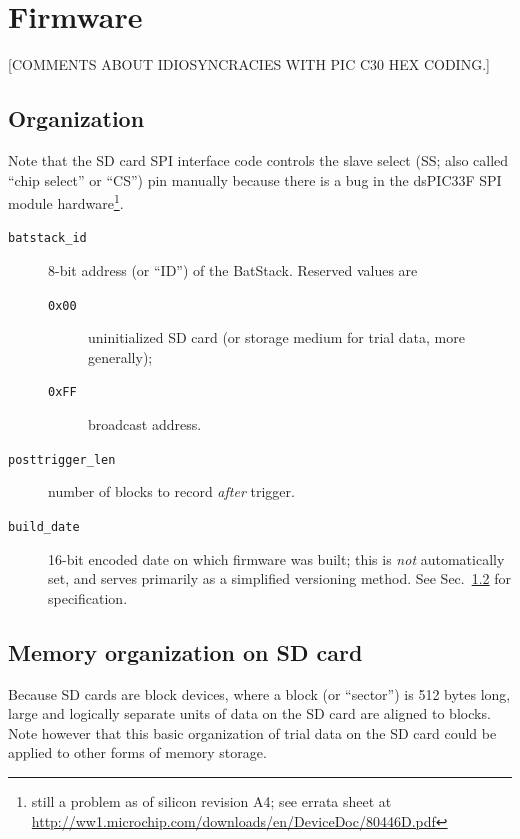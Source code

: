 \documentclass[letterpaper]{article}
\begin{document}
\section{Firmware}
\label{firmware:sec}

[COMMENTS ABOUT IDIOSYNCRACIES WITH PIC C30 HEX CODING.]

\subsection{Organization}

Note that the SD card SPI interface code controls the slave select
(SS; also called ``chip select'' or ``CS'') pin manually because there
is a bug in the dsPIC33F SPI module hardware\footnote{still a problem
  as of silicon revision A4; see errata sheet at
  \url{http://ww1.microchip.com/downloads/en/DeviceDoc/80446D.pdf}}.

\begin{description}
\item[\texttt{batstack\_id}] 8-bit address (or ``ID'') of the
  BatStack. Reserved values are
  \begin{description}
  \item[\texttt{0x00}] uninitialized SD card (or storage medium for
    trial data, more generally);
  \item[\texttt{0xFF}] broadcast address.
  \end{description}

\item[\texttt{posttrigger\_len}] number of blocks to record
  \textit{after} trigger.

\item[\texttt{build\_date}] 16-bit encoded date on which firmware was
  built; this is \textit{not} automatically set, and serves primarily
  as a simplified versioning method. See Sec.~\ref{bulkmemorg:sec} for
  specification.
\end{description}

\subsection{Memory organization on SD card}
\label{bulkmemorg:sec}

Because SD cards are block devices, where a block (or ``sector'') is
512 bytes long, large and logically separate units of data on the SD
card are aligned to blocks. Note however that this basic organization
of trial data on the SD card could be applied to other forms of memory
storage.
\end{document}
